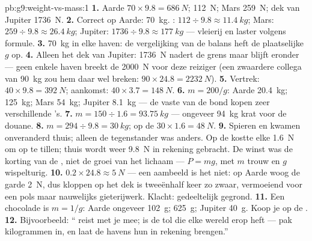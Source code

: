 \begin{solution}{pb:g9:weight-vs-mass:1}
\textbf{1.} Aarde $70 \times 9.8 = \qty{686}{N}$; 
\qty{112}{N}; Mars \qty{259}{N}; dek van Jupiter \qty{1736}{N}.
\textbf{2.} Correct op Aarde: \qty{70}{kg}. : $112 \div
9.8 \approx \qty{11.4}{kg}$; Mars: $259 \div 9.8 \approx
\qty{26.4}{kg}$; Jupiter: $1736 \div 9.8 \approx \qty{177}{kg}$ ---
vleierij en laster volgens formule.
\textbf{3.} \qty{70}{kg} in elke haven: de vergelijking van de balans
heft de plaatselijke $g$ op.
\textbf{4.} Alleen het dek van Jupiter: \qty{1736}{N} nadert de grens
maar blijft eronder --- geen enkele haven breekt de \qty{2000}{N} voor
deze reiziger (een zwaardere collega van \qty{90}{kg} zou hem daar wel
breken: $90 \times 24.8 = \qty{2232}{N}$).
\textbf{5.} Vertrek: $40 \times 9.8 = \qty{392}{N}$; aankomst: $40
\times 3.7 = \qty{148}{N}$.
\textbf{6.} $m = 200/g$: Aarde \qty{20.4}{kg}; 
\qty{125}{kg}; Mars \qty{54}{kg}; Jupiter \qty{8.1}{kg} --- de vaste
 van de bond kopen zeer verschillende 's.
\textbf{7.} $m = 150 \div 1.6 = \qty{93.75}{kg}$ --- ongeveer
\qty{94}{kg} krat voor de douane.
\textbf{8.} $m = 294 \div 9.8 = \qty{30}{kg}$;  op de
 $30 \times 1.6 = \qty{48}{N}$.
\textbf{9.} Spieren en  kwamen onveranderd thuis; alleen de
tegenstander was anders. Op de  kostte elke
 \qty{1.6}{N} om op te tillen; thuis wordt weer
\qty{9.8}{N} in rekening gebracht. De winst was de korting van de
, niet de groei van het lichaam --- $P = m g$, met $m$
trouw en $g$ wispelturig.
\textbf{10.} $0.2 \times 24.8 \approx \qty{5}{N}$ --- een aambeeld is
het niet: op Aarde woog de garde \qty{2}{N}, dus kloppen op het dek is
tweeënhalf keer zo zwaar, vermoeiend voor een pols maar nauwelijks
gieterijwerk. Klacht: gedeeltelijk gegrond.
\textbf{11.} Een  chocolade is $m = 1/g$: Aarde ongeveer
\qty{102}{g};  \qty{625}{g}; Jupiter \qty{40}{g}. Koop je
 op de .
\textbf{12.} Bijvoorbeeld: `` reist met je mee;
 is de tol die elke wereld erop heft --- pak
kilogrammen in, en laat de havens hun
 in rekening brengen.''
\end{solution}
